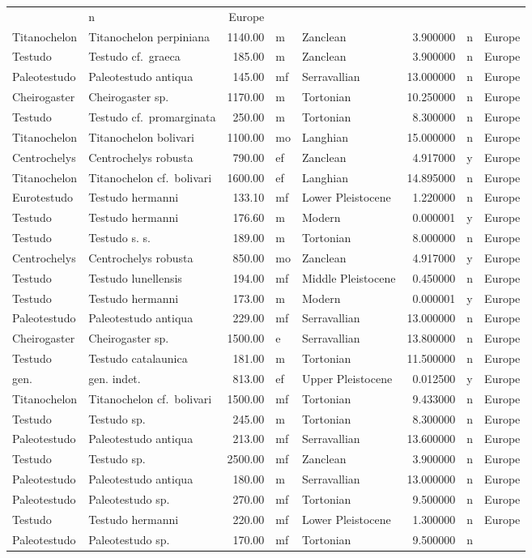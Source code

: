 \begin{landscape}
\begin{longtable}[]{@{}llrllrll@{}}
	& n & Europe\tabularnewline
	Titanochelon & Titanochelon perpiniana & 1140.00 & m & Zanclean &
	3.900000 & n & Europe\tabularnewline
	Testudo & Testudo cf.~graeca & 185.00 & m & Zanclean & 3.900000 & n &
	Europe\tabularnewline
	Paleotestudo & Paleotestudo antiqua & 145.00 & mf & Serravallian &
	13.000000 & n & Europe\tabularnewline
	Cheirogaster & Cheirogaster sp. & 1170.00 & m & Tortonian & 10.250000 &
	n & Europe\tabularnewline
	Testudo & Testudo cf.~promarginata & 250.00 & m & Tortonian & 8.300000 &
	n & Europe\tabularnewline
	Titanochelon & Titanochelon bolivari & 1100.00 & mo & Langhian &
	15.000000 & n & Europe\tabularnewline
	Centrochelys & Centrochelys robusta & 790.00 & ef & Zanclean & 4.917000
	& y & Europe\tabularnewline
	Titanochelon & Titanochelon cf.~bolivari & 1600.00 & ef & Langhian &
	14.895000 & n & Europe\tabularnewline
	Eurotestudo & Testudo hermanni & 133.10 & mf & Lower Pleistocene &
	1.220000 & n & Europe\tabularnewline
	Testudo & Testudo hermanni & 176.60 & m & Modern & 0.000001 & y &
	Europe\tabularnewline
	Testudo & Testudo s. s. & 189.00 & m & Tortonian & 8.000000 & n &
	Europe\tabularnewline
	Centrochelys & Centrochelys robusta & 850.00 & mo & Zanclean & 4.917000
	& y & Europe\tabularnewline
	Testudo & Testudo lunellensis & 194.00 & mf & Middle Pleistocene &
	0.450000 & n & Europe\tabularnewline
	Testudo & Testudo hermanni & 173.00 & m & Modern & 0.000001 & y &
	Europe\tabularnewline
	Paleotestudo & Paleotestudo antiqua & 229.00 & mf & Serravallian &
	13.000000 & n & Europe\tabularnewline
	Cheirogaster & Cheirogaster sp. & 1500.00 & e & Serravallian & 13.800000
	& n & Europe\tabularnewline
	Testudo & Testudo catalaunica & 181.00 & m & Tortonian & 11.500000 & n &
	Europe\tabularnewline
	gen. & gen. indet. & 813.00 & ef & Upper Pleistocene & 0.012500 & y &
	Europe\tabularnewline
	Titanochelon & Titanochelon cf.~bolivari & 1500.00 & mf & Tortonian &
	9.433000 & n & Europe\tabularnewline
	Testudo & Testudo sp. & 245.00 & m & Tortonian & 8.300000 & n &
	Europe\tabularnewline
	Paleotestudo & Paleotestudo antiqua & 213.00 & mf & Serravallian &
	13.600000 & n & Europe\tabularnewline
	Testudo & Testudo sp. & 2500.00 & mf & Zanclean & 3.900000 & n &
	Europe\tabularnewline
	Paleotestudo & Paleotestudo antiqua & 180.00 & m & Serravallian &
	13.000000 & n & Europe\tabularnewline
	Paleotestudo & Paleotestudo sp. & 270.00 & mf & Tortonian & 9.500000 & n
	& Europe\tabularnewline
	Testudo & Testudo hermanni & 220.00 & mf & Lower Pleistocene & 1.300000
	& n & Europe\tabularnewline
	Paleotestudo & Paleotestudo sp. & 170.00 & mf & Tortonian & 9.500000 & n

\end{longtable}
\end{landscape}
